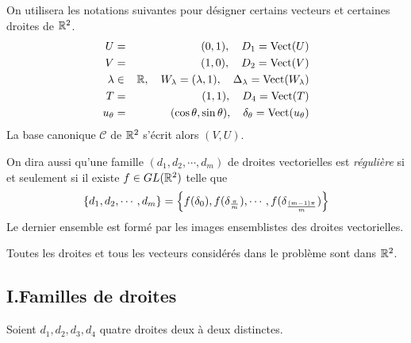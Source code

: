 On utilisera les notations suivantes pour d{\'e}signer certains
vecteurs et certaines droites de $\mathbb{R}^{2}$.
\begin{eqnarray*}
U &=&(0,1),\quad D_{1}=\text{Vect}(U) \\
V &=&(1,0),\quad D_{2}=\text{Vect}(V) \\
\lambda  &\in &\R,\quad W_{\lambda }=(\lambda ,1),\quad
\Delta
_{\lambda }=\text{Vect}(W_{\lambda }) \\
T &=&(1,1),\quad D_{4}=\text{Vect}(T) \\
u_{\theta } &=&(\cos \theta ,\sin \theta ),\quad \delta _{\theta }=\text{Vect%
}(u_{\theta })
\end{eqnarray*}
La base canonique $\mathcal{C}$ de $\mathbb{R}^{2}$ s'{\'e}crit alors
$(V,U). $

On dira aussi qu'une famille $(d_{1},d_{2},\cdots ,d_{m})$ de
droites vectorielles est \emph{r{\'e}guli{\`e}re }si et seulement
si il existe $f\in GL(\mathbb{R}^{2})$ telle que
\[
\left\{ d_{1},d_{2},\cdots ,d_{m}\right\} =\left\{ f(\delta _{0}),f(\delta _{%
\frac{\pi }{m}}),\cdots ,f(\delta _{\frac{(m-1)\pi }{m}})\right\}
\]
Le dernier ensemble est form{\'e} par les images ensemblistes des droites
vectorielles.

Toutes les droites et tous les vecteurs consid{\'e}r{\'e}s dans le
probl{\`e}me sont dans $\mathbb{R}^{2}$.

\subsection*{I.\qquad Familles de droites}

Soient $d_{1},d_{2},d_{3},d_{4}$ quatre droites deux {\`a} deux distinctes.

